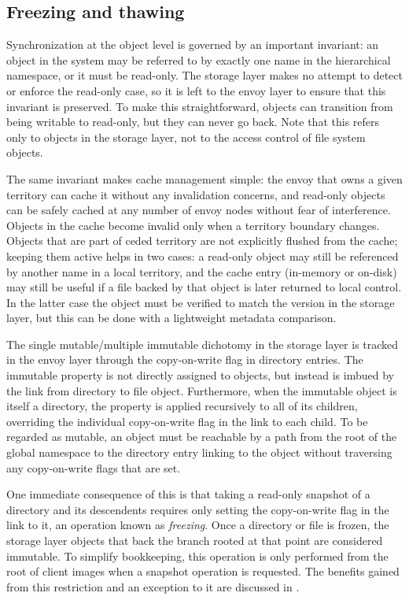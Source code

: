 \subsection{Freezing and thawing}\label{sec:freeze-thaw}

Synchronization at the object level is governed by an important invariant: an object in the system may be referred to by exactly one name in the hierarchical namespace, or it must be read-only. The storage layer makes no attempt to detect or enforce the read-only case, so it is left to the envoy layer to ensure that this invariant is preserved. To make this straightforward, objects can transition from being writable to read-only, but they can never go back. Note that this refers only to objects in the storage layer, not to the access control of file system objects.

The same invariant makes cache management simple: the envoy that owns a given territory can cache it without any invalidation concerns, and read-only objects can be safely cached at any number of envoy nodes without fear of interference. Objects in the cache become invalid only when a territory boundary changes. Objects that are part of ceded territory are not explicitly flushed from the cache; keeping them active helps in two cases: a read-only object may still be referenced by another name in a local territory, and the cache entry (in-memory or on-disk) may still be useful if a file backed by that object is later returned to local control. In the latter case the object must be verified to match the version in the storage layer, but this can be done with a lightweight metadata comparison.

The single mutable/multiple immutable dichotomy in the storage layer is tracked in the envoy layer through the copy-on-write flag in directory entries. The immutable property is not directly assigned to objects, but instead is imbued by the link from directory to file object. Furthermore, when the immutable object is itself a directory, the property is applied recursively to all of its children, overriding the individual copy-on-write flag in the link to each child. To be regarded as mutable, an object must be reachable by a path from the root of the global namespace to the directory entry linking to the object without traversing any copy-on-write flags that are set.

One immediate consequence of this is that taking a read-only snapshot of a directory and its descendents requires only setting the copy-on-write flag in the link to it, an operation known as \emph{freezing}. Once a directory or file is frozen, the storage layer objects that back the branch rooted at that point are considered immutable. To simplify bookkeeping, this operation is only performed from the root of client images when a snapshot operation is requested. The benefits gained from this restriction and an exception to it are discussed in .

